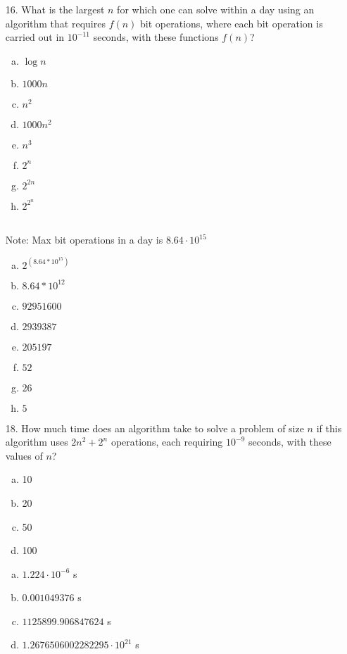 \begin{itemize}
    \item[16.] What is the largest $n$ for which one can solve within a day using an algorithm that requires $f(n)$ bit operations, where each bit operation is carried out in $10^{-11}$ seconds, with these functions $f(n)$?
          \begin{enumerate}[a.]
              \item $\log{} n$
              \item $1000n$
              \item $n^2$
              \item $1000n^2$
              \item $n^3$
              \item $2^n$
              \item $2^{2n}$
              \item $2^{2^n}$
          \end{enumerate}
          \answer \\
          Note: Max bit operations in a day is $8.64 \cdot 10^{15}$
          \begin{enumerate}[a.]
              \item $2^{(8.64*10^{15})}$
              \item $8.64*10^{12}$
              \item $92951600$
              \item $2939387$
              \item $205197$
              \item $52$
              \item $26$
              \item $5$
          \end{enumerate}
    \item[18.] How much time does an algorithm take to solve a problem of size $n$ if this algorithm uses $2n^2 + 2^n$ operations, each requiring $10^{-9}$ seconds, with these values of $n$?
    \begin{enumerate}[a.]
          \item 10
          \item 20
          \item 50
          \item 100
    \end{enumerate}
\answer
\begin{enumerate}[a.]
          \item $1.224 \cdot 10^{-6}$ s
          \item $0.001049376$ s
          \item $1125899.906847624$ s
          \item $1.2676506002282295 \cdot 10^{21}$ s
\end{enumerate}

\end{itemize}
